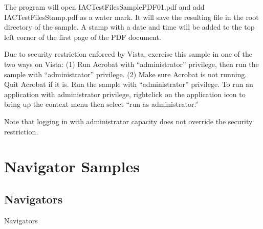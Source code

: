 \documentclass[letterpaper,12pt,english,openany,oneside]{sphinxmanual}
\begin{document}
\label{\detokenize{Samples_WindowsIAC:usage-16}}

The program will open IACTestFilesSamplePDF01.pdf and add IACTestFilesStamp.pdf as a water mark. It will save the resulting file in the root directory of the sample. A stamp with a date and time will be added to the top left corner of the first page of the PDF document.

Due to security restriction enforced by Vista, exercise this sample in one of the two ways on Vista: (1) Run Acrobat with “administrator” privilege, then run the sample with “administrator” privilege. (2) Make sure Acrobat is not running. Quit Acrobat if it is. Run the sample with “administrator” privilege. To run an application with administrator privilege, right\sphinxhyphen{}click on the application icon to bring up the context menu then select “run as administrator.”

Note that logging in with administrator capacity does not override the security restriction.


\chapter{Navigator Samples}
\label{\detokenize{Samples_Navigator:navigator-samples}}\label{\detokenize{Samples_Navigator::doc}}

\section{Navigators}
\label{\detokenize{Samples_Navigator:navigators}}

Navigators

\end{document}
